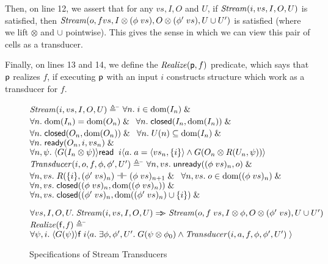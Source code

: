Then, on line 12, we assert that for any $vs, I, O$ and $U$, if
$\mathit{Stream}(i, vs, I, O, U)$ is satisfied, then $\mathit{Stream}(o, f vs, I
\otimes (\phi\;vs), O \otimes (\phi'\;vs), U \cup U')$ is satisfied (where we lift
$\otimes$ and $\cup$ pointwise). This gives the sense in which 
we can view this pair of cells as a transducer. 

Finally, on lines 13 and 14, we define the $\mathit{Realize}(\mathsf{p}, f)$
predicate, which says that $\mathsf{p}$ realizes $f$, if executing
$\mathsf{p}$ with an input $i$ constructs structure which work as a
transducer for $f$.

\begin{figure}
\begin{specification}
\nextline $\mathit{Stream}(i, vs, I, O, U) \triangleq$ 
\nextline \qquad 
          \= $\forall n.\; i \in \mbox{dom}({I_n}) \;\&\;$ 
\nextline \> $\forall n.\; \mbox{dom}({I_n}) = \mbox{dom}({O_n}) \;\&\;$ 
\nextline \> $\forall n.\; \mathsf{closed}({I_n}, {\mbox{dom}({I_n})}) \;\&\;$
\nextline \> $\forall n.\; \mathsf{closed}({O_n}, {\mbox{dom}({O_n})}) \;\&\;$
\nextline \> $\forall n.\; U(n) \subseteq \mbox{dom}({I_n}) \;\&\;$ 
\nextline \> $\forall n.\; \mathsf{ready}({O_n}, {i}, {vs_n}) \;\&\;$ 
\nextline \> $\forall n, \psi.\; \langle{ G(I_n \otimes \psi) }\rangle{\mathsf{read}\;\;i}\langle{a}.\;{a = \left<{vs_n},{\{{i}\}}\right> \land G(O_n \otimes R(U_n, \psi)) }\rangle$ 
\\
\nextline $\mathit{Transducer}(i, o, f, \phi, \phi', U') \triangleq$ 
\nextline \qquad 
          \= $\forall n, vs.\; \mathsf{unready}({(\phi\;vs)_n}, {o}) \;\&\;$ 
\nextline \> $\forall n, vs.\; R(\{{i}\}, (\phi'\;vs)_n) \dashv\vdash (\phi\;vs)_{n+1} \;\&\;$
\nextline \> $\forall n, vs.\; o \in \mbox{dom}({(\phi\;vs)_n}) \;\&\; $ 
\nextline \> $\forall n, vs.\; \mathsf{closed}({(\phi\;vs)_n}, {\mbox{dom}({(\phi\;vs)_n})}) \;\&\;$ 
\nextline \> $\forall n, vs.\; \mathsf{closed}({(\phi'\;vs)_n}, {\mbox{dom}({(\phi'\;vs)_n}) \cup \{{i}\}}) \;\&\;$ 

\nextline \> $\forall vs, I, O, U.\; \mathit{Stream}(i, vs, I, O, U) \Rightarrow\!\!\!> \mathit{Stream}(o, f\;vs, I \otimes \phi, O \otimes (\phi'\;vs), U \cup U')$
\\
\nextline $\mathit{Realize}(\mathsf{f}, \mathit{f}) \triangleq$ 
\nextline \qquad 
          \= $\forall \psi, i.\;\langle{ G(\psi) }\rangle{\mathsf{f}\;i}\langle{a}.\;{\exists \phi, \phi',  U'.\; G(\psi \otimes \phi_0) \land \mathit{Transducer}(i, a, f, \phi, \phi', U')\;}\rangle$
\end{specification}  
\caption{Specifications of Stream Transducers}
\label{transducer-specification}
\end{figure}


